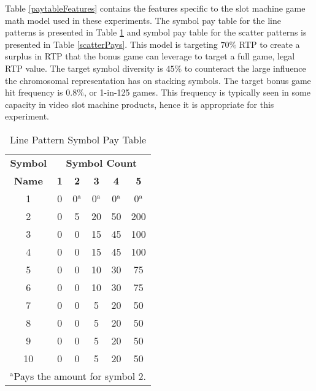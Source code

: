 \documentclass[conference]{IEEEtran}
\begin{document}
\par
Table \ref{paytableFeatures} contains the features specific to the slot machine game math model used in these experiments.
The symbol pay table for the line patterns is presented in Table \ref{linePays} and symbol pay table for the scatter patterns is presented in Table \ref{scatterPays}.
This model is targeting $70\%$ RTP to create a surplus in RTP that the bonus game can leverage to target a full game, legal RTP value.
The target symbol diversity is $45\%$ to counteract the large influence the chromosomal representation has on stacking symbols.
The target bonus game hit frequency is $0.8\%$, or 1-in-125 games.
This frequency is typically seen in some capacity in video slot machine products, hence it is appropriate for this experiment.
\begin{table}[htbp]
\caption{Line Pattern Symbol Pay Table}
\begin{center}
\begin{tabular}{|c|c|c|c|c|c|}
\hline
\textbf{Symbol}&\multicolumn{5}{|c|}{\textbf{Symbol Count}} \\
\cline{2-6} 
\textbf{Name} & \textbf{1}& \textbf{2}& \textbf{3}& \textbf{4}& \textbf{5} \\
\hline
1& 0 & 0$^{\mathrm{a}}$ & 0$^{\mathrm{a}}$ & 0$^{\mathrm{a}}$ & 0$^{\mathrm{a}}$  \\
\hline
2& 0 & 5 & 20 & 50 & 200  \\
\hline
3& 0 & 0 & 15 & 45 & 100  \\
\hline
4& 0 & 0 & 15 & 45 & 100  \\
\hline
5& 0 & 0 & 10 & 30 & 75  \\
\hline
6& 0 & 0 & 10 & 30 & 75  \\
\hline
7& 0 & 0 & 5 & 20 & 50  \\
\hline
8& 0 & 0 & 5 & 20 & 50  \\
\hline
9& 0 & 0 & 5 & 20 & 50  \\
\hline
10& 0 & 0 & 5 & 20 & 50  \\
\hline
\multicolumn{6}{l}{$^{\mathrm{a}}$Pays the amount for symbol 2.}
\end{tabular}
\label{linePays}
\end{center}
\end{table}
\end{document}
